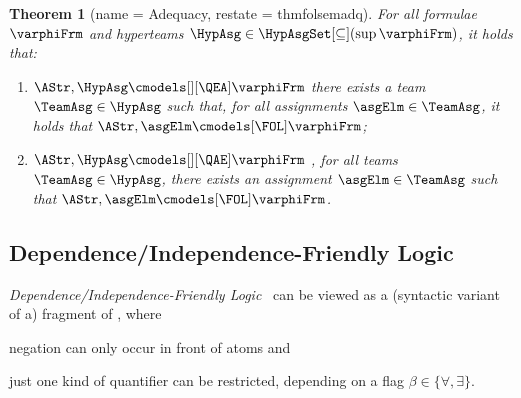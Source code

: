 \documentclass[authoryear]{elsarticle}
\newtheorem{theorem}{Theorem}
\begin{document}
\begin{theorem}[name = \FOL Adequacy, restate = thmfolsemadq]
  \label{thm:folsemadq}
  For all \FOL formulae $\varphiFrm$ and hyperteams $\HypAsg \in
  \HypAsgSet[\subseteq](\sup{\varphiFrm})$, it holds that:
  \begin{enumerate}[1)]
    \item\label{thm:folsemadq(ea)}
      $\AStr, \HypAsg \cmodels[][\QEA] \varphiFrm$ \iff there exists a team
      $\TeamAsg \in \HypAsg$ such that, for all assignments $\asgElm \in
      \TeamAsg$, it holds that $\AStr, \asgElm \cmodels[\FOL] \varphiFrm$;
    \item\label{thm:folsemadq(ae)}
      $\AStr, \HypAsg \cmodels[][\QAE] \varphiFrm$ \iff, for all teams $\TeamAsg
      \in \HypAsg$, there exists an assignment $\asgElm \in \TeamAsg$ such that
      $\AStr, \asgElm \cmodels[\FOL] \varphiFrm$.
  \end{enumerate}
\end{theorem}






\subsection{Dependence/Independence-Friendly Logic}
\label{sec:adq;sub:dif}

\emph{Dependence/Independence-Friendly Logic}~\citep{Vaa07,HS89} can be viewed
as a (syntactic variant of a) fragment of \ADIF, where
\begin{inparaenum}[i)]
  \item
    negation can only occur in front of atoms and
  \item
    just one kind of quantifier can be restricted, depending on a flag $\beta
    \in \{ \forall, \exists\}$.
\end{inparaenum}
\end{document}
